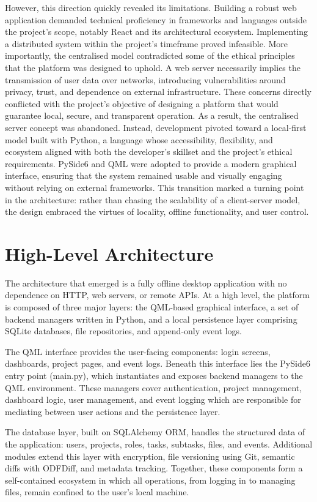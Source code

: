 \documentclass{report}
\begin{document}
However, this direction quickly revealed its limitations. Building a robust web application demanded technical proficiency in frameworks and languages outside the project’s scope, notably React and its architectural ecosystem. Implementing a distributed system within the project’s timeframe proved infeasible. More importantly, the centralised model contradicted some of the ethical principles that the platform was designed to uphold. A web server necessarily implies the transmission of user data over networks, introducing vulnerabilities around privacy, trust, and dependence on external infrastructure. These concerns directly conflicted with the project’s objective of designing a platform that would guarantee local, secure, and transparent operation.
As a result, the centralised server concept was abandoned. Instead, development pivoted toward a local-first model built with Python, a language whose accessibility, flexibility, and ecosystem aligned with both the developer’s skillset and the project’s ethical requirements. PySide6 and QML were adopted to provide a modern graphical interface, ensuring that the system remained usable and visually engaging without relying on external frameworks. This transition marked a turning point in the architecture: rather than chasing the scalability of a client-server model, the design embraced the virtues of locality, offline functionality, and user control.
\section{High-Level Architecture}

The architecture that emerged is a fully offline desktop application with no dependence on HTTP, web servers, or remote APIs. At a high level, the platform is composed of three major layers: the QML-based graphical interface, a set of backend managers written in Python, and a local persistence layer comprising SQLite databases, file repositories, and append-only event logs.

The QML interface provides the user-facing components: login screens, dashboards, project pages, and event logs. Beneath this interface lies the PySide6 entry point (main.py), which instantiates and exposes backend managers to the QML environment. These managers cover authentication, project management, dashboard logic, user management, and event logging which are responsible for mediating between user actions and the persistence layer.

The database layer, built on SQLAlchemy ORM, handles the structured data of the application: users, projects, roles, tasks, subtasks, files, and events. Additional modules extend this layer with encryption, file versioning using Git, semantic diffs with ODFDiff, and metadata tracking. Together, these components form a self-contained ecosystem in which all operations, from logging in to managing files, remain confined to the user’s local machine.
\end{document}
